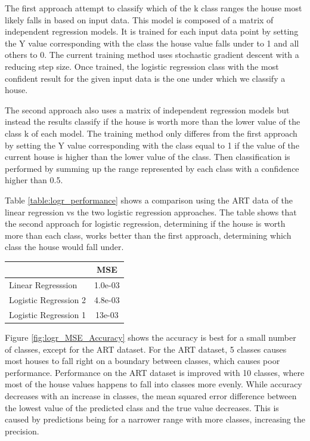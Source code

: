\documentclass[10pt]{article}
\begin{document}
\begin{multicols}{2}
		The first approach attempt to classify which of the k class ranges the house most likely falls in based on input data. This model is composed of a matrix of independent regression models. It is trained for each input data point by setting the Y value corresponding with the class the house value falls under to 1 and all others to 0. The current training method uses stochastic gradient descent with a reducing step size. Once trained, the logistic regression class with the most confident result for the given input data is the one under which we classify a house.

	 	The second approach also uses a matrix of independent regression models but instead the results classify if the house is worth more than the lower value of the class k of each model. The training method only differes from the first approach by setting the Y value corresponding with the class equal to 1 if the value of the current house is higher than the lower value of the class. Then classification is performed by summing up the range represented by each class with a confidence higher than 0.5.

 		Table \ref{table:logr_performance} shows a comparison using the ART data of the linear regression vs the two logistic regression approaches. The table shows that the second approach for logistic regression, determining if the house is worth more than each class, works better than the first approach, determining which class the house would fall under.
		\begin{center}
	        \captionsetup{type=table}
			\begin{tabular}{l|c}
				& \small{MSE} \\
				\hline
				\small{Linear Regresssion} & \small{1.0e-03} \\
				\hline
				\small{Logistic Regression 2} & \small{4.8e-03} \\
				\hline
				\small{Logistic Regression 1} & \small{13e-03} \\
				\hline
			\end{tabular}
			\label{table:logr_performance}        
			\setlength{\parindent}{15pt}
		\end{center}
	
		Figure \ref{fig:logr_MSE_Accuracy} shows the accuracy is best for a small number of classes, except for the ART dataset. For the ART dataset, 5 classes causes most houses to fall right on a boundary between classes, which causes poor performance. Performance on the ART dataset is improved with 10 classes, where most of the house values happens to fall into classes more evenly. While accuracy decreases with an increase in classes, the mean squared error difference between the lowest value of the predicted class and the true value decreases. This is caused by predictions being for a narrower range with more classes, increasing the precision.


\end{multicols}
\end{document}
